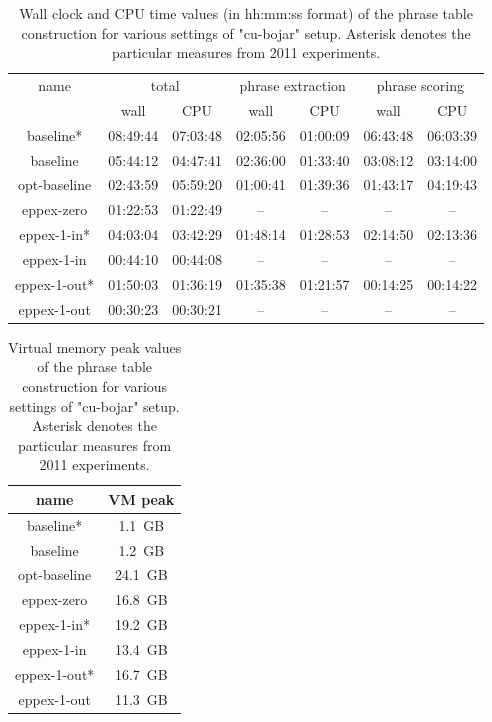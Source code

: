 \begin{table}[ht]
\centering
\begin{tabular}{ | c | c c | c c | c c | }
\hline
name & \multicolumn{2}{|c|}{total} & \multicolumn{2}{|c|}{phrase extraction} & \multicolumn{2}{|c|}{phrase scoring} \\
 & wall & CPU & wall & CPU & wall & CPU \\
\hline
\hline
baseline*    & 08:49:44 & 07:03:48 & 02:05:56 & 01:00:09 & 06:43:48 & 06:03:39 \\
baseline     & 05:44:12 & 04:47:41 & 02:36:00 & 01:33:40 & 03:08:12 & 03:14:00 \\
opt-baseline & 02:43:59 & 05:59:20 & 01:00:41 & 01:39:36 & 01:43:17 & 04:19:43 \\ %
eppex-zero   & 01:22:53 & 01:22:49 & -- & -- & -- & -- \\
\hline
eppex-1-in*  & 04:03:04 & 03:42:29 & 01:48:14 & 01:28:53 & 02:14:50 & 02:13:36 \\
eppex-1-in   & 00:44:10 & 00:44:08 & -- & -- & -- & -- \\
\hline
eppex-1-out* & 01:50:03 & 01:36:19 & 01:35:38 & 01:21:57 & 00:14:25 & 00:14:22 \\
eppex-1-out  & 00:30:23 & 00:30:21 & -- & -- & -- & -- \\
\hline
\end{tabular}
\caption{\label{cu-bojar-time-benchmarks}Wall clock and CPU time values
(in hh:mm:ss format) of the phrase table construction for various settings
of "cu-bojar" setup. Asterisk denotes the particular measures from 2011
experiments.}
\end{table}

\begin{table}[ht]
\centering
\begin{tabular}{ | c | c | }
\hline
name & VM peak \\
\hline
\hline
baseline*    & 1.1~GB \\
baseline     & 1.2~GB \\
opt-baseline & 24.1~GB \\ %
eppex-zero   & 16.8~GB \\
\hline
eppex-1-in*  & 19.2~GB \\
eppex-1-in   & 13.4~GB \\
\hline
eppex-1-out* & 16.7~GB \\
eppex-1-out  & 11.3~GB \\
\hline
\end{tabular}
\caption{\label{cu-bojar-vm-peak-benchmarks}Virtual memory peak values
of the phrase table construction for various settings of "cu-bojar" setup.
Asterisk denotes the particular measures from 2011 experiments.}
\end{table}
